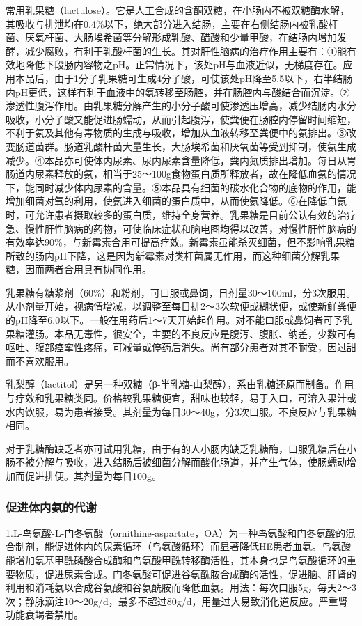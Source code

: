 常用乳果糖（lactulose）。它是人工合成的含酮双糖，在小肠内不被双糖酶水解，其吸收与排泄均在0.4\%以下，绝大部分进入结肠，主要在右侧结肠内被乳酸杆菌、厌氧杆菌、大肠埃希菌等分解形成乳酸、醋酸和少量甲酸，在结肠内增加发酵，减少腐败，有利于乳酸杆菌的生长。其对肝性脑病的治疗作用主要有：①能有效地降低下段肠内容物之pH。正常情况下，该处pH与血液近似，无梯度存在。应用本品后，由于1分子乳果糖可生成4分子酸，可使该处pH降至5.5以下，右半结肠内pH更低，这样有利于血液中的氨转移至肠腔，并在肠腔内与酸结合而沉淀。②渗透性腹泻作用。由乳果糖分解产生的小分子酸可使渗透压增高，减少结肠内水分吸收，小分子酸又能促进肠蠕动，从而引起腹泻，使粪便在肠腔内停留时间缩短，不利于氨及其他有毒物质的生成与吸收，增加从血液转移至粪便中的氨排出。③改变肠道菌群。肠道乳酸杆菌大量生长，大肠埃希菌和厌氧菌等受到抑制，使氨生成减少。④本品亦可使体内尿素、尿内尿素含量降低，粪内氮质排出增加。每日从胃肠道内尿素释放的氨，相当于25～100g食物蛋白质所释放者，故在降低血氨的情况下，能同时减少体内尿素的含量。⑤本品具有细菌的碳水化合物的底物的作用，能增加细菌对氧的利用，使氨进入细菌的蛋白质中，从而使氨降低。⑥在降低血氨时，可允许患者摄取较多的蛋白质，维持全身营养。乳果糖是目前公认有效的治疗急、慢性肝性脑病的药物，可使临床症状和脑电图均得以改善，对慢性肝性脑病的有效率达90\%，与新霉素合用可提高疗效。新霉素虽能杀灭细菌，但不影响乳果糖所致的肠内pH下降，这是因为新霉素对类杆菌属无作用，而这种细菌分解乳果糖，因而两者合用具有协同作用。

乳果糖有糖浆剂（60\%）和粉剂，可口服或鼻饲，日剂量30～100ml，分3次服用。从小剂量开始，视病情增减，以调整至每日排2～3次软便或糊状便，或使新鲜粪便的pH降至6.0以下。一般在用药后1～7天开始起作用。对不能口服或鼻饲者可予乳果糖灌肠。本品无毒性，很安全，主要的不良反应是腹泻、腹胀、纳差，少数可有呕吐、腹部痉挛性疼痛，可减量或停药后消失。尚有部分患者对其不耐受，因过甜而不喜欢服用。

乳梨醇（lactitol）是另一种双糖（β-半乳糖-山梨醇），系由乳糖还原而制备。作用与疗效和乳果糖类同。价格较乳果糖便宜，甜味也较轻，易于入口，可溶入果汁或水内饮服，易为患者接受。其剂量为每日30～40g，分3次口服。不良反应与乳果糖相同。

对于乳糖酶缺乏者亦可试用乳糖，由于有的人小肠内缺乏乳糖酶，口服乳糖后在小肠不被分解与吸收，进入结肠后被细菌分解而酸化肠道，并产生气体，使肠蠕动增加而促进排便。其剂量为每日100g。

\subsubsection{促进体内氨的代谢}

1.L-鸟氨酸-L-门冬氨酸（ornithine-aspartate，OA）为一种鸟氨酸和门冬氨酸的混合制剂，能促进体内的尿素循环（鸟氨酸循环）而显著降低HE患者血氨。鸟氨酸能增加氨基甲酰磷酸合成酶和鸟氨酸甲酰转移酶活性，其本身也是鸟氨酸循环的重要物质，促进尿素合成。门冬氨酸可促进谷氨酰胺合成酶的活性，促进脑、肝肾的利用和消耗氨以合成谷氨酸和谷氨酰胺而降低血氨。用法：每次口服5g，每天2～3次；静脉滴注10～20g/d，最多不超过80g/d，用量过大易致消化道反应。严重肾功能衰竭者禁用。

